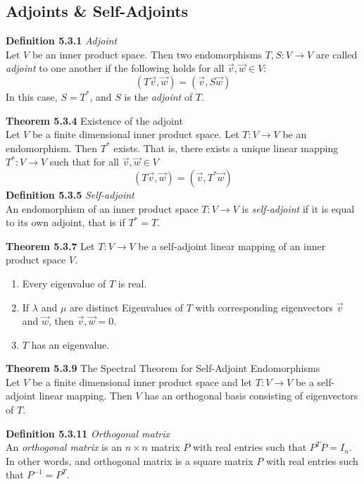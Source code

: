 \documentclass[8pt,landscape]{article}
\begin{document}
\begin{multicols}{3}
    \subsection{Adjoints \& Self-Adjoints}

    \textbf{Definition 5.3.1} \emph{Adjoint} \\
    Let $V$ be an inner product space.
    Then two endomorphisms $T, S : V \to V$ are called \emph{adjoint} to one another
    if the following holds for all $\vec{v}, \vec{w} \in V$:
    \[
        (T \vec{v}, \vec{w}) = (\vec{v}, S \vec{w})
    \]
    In this case, $S = T^*$, and $S$ is the \emph{adjoint} of $T$.

    \textbf{Theorem 5.3.4} Existence of the adjoint \\
    Let $V$ be a finite dimensional inner product space.
    Let $T : V \to V$ be an endomorphism.
    Then $T^*$ exists.
    That is, there exists a unique linear mapping $T^* : V \to V$ such that for all
    $\vec{v}, \vec{w} \in V$
    \[
        (T \vec{v}, \vec{w}) = (\vec{v}, T^* \vec{w})
    \]
    \textbf{Definition 5.3.5} \emph{Self-adjoint} \\
    An endomorphism of an inner product space $T : V \to V$ is \emph{self-adjoint}
    if it is equal to its own adjoint, that is if $T^* = T$.

    \textbf{Theorem 5.3.7}
    Let $T : V \to V$ be a self-adjoint linear mapping of an inner product space $V$.
    \begin{enumerate}
        \item Every eigenvalue of $T$ is real.
        \item If $\lambda$ and $\mu$ are distinct Eigenvalues of $T$ with corresponding
            eigenvectors $\vec{v}$ and $\vec{w}$, then $\vec{v}, \vec{w} = 0$.
        \item $T$ has an eigenvalue.
    \end{enumerate}

    \textbf{Theorem 5.3.9} The Spectral Theorem for Self-Adjoint Endomorphisms \\
    Let $V$ be a finite dimensional inner product space and let $T : V \to V$ be a
    self-adjoint linear mapping.
    Then $V$ has an orthogonal basis consisting of eigenvectors of $T$.

    \textbf{Definition 5.3.11} \emph{Orthogonal matrix} \\
    An \emph{orthogonal matrix} is an $n \times n$ matrix $P$ with real entries
    such that $P^T P = I_n$.
    In other words, and orthogonal matrix is a square matrix $P$ with real entries such
    that $P^{-1} = P^T$.


\end{multicols}
\end{document}
